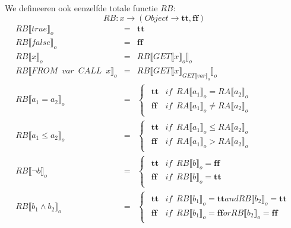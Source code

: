 \documentclass[12pt]{article}
\begin{document}
We defineeren ook eenzelfde totale functie $ RB $:
\[ RB: x \rightarrow (Object \rightarrow {\boldsymbol{tt},\boldsymbol{ff}} ) \]
\[
\begin{matrix}
RB\llbracket true \rrbracket_o & = & \boldsymbol{tt}\\
RB\llbracket false \rrbracket_o & = & \boldsymbol{ff}\\

RB\llbracket x \rrbracket_o & = & RB\llbracket GET\llbracket x \rrbracket_o \rrbracket_o\\

RB\llbracket FROM \enspace var \enspace CALL \enspace x \rrbracket_o & = & RB\llbracket GET\llbracket x \rrbracket_{GET\llbracket var \rrbracket_o} \rrbracket_o\\

RB\llbracket a_1 = a_2 \rrbracket_o & = &
\begin{cases}
\begin{matrix}
\boldsymbol{tt} & if \enspace RA\llbracket a_1 \rrbracket_o = RA\llbracket a_2 \rrbracket_o \\
\boldsymbol{ff} & if \enspace RA\llbracket a_1 \rrbracket_o \not= RA\llbracket a_2 \rrbracket_o
\end{matrix}
\end{cases}\\

RB\llbracket a_1 \leq a_2 \rrbracket_o & = &
\begin{cases}
\begin{matrix}
\boldsymbol{tt} & if \enspace RA\llbracket a_1 \rrbracket_o \leq RA\llbracket a_2 \rrbracket_o \\
\boldsymbol{ff} & if \enspace RA\llbracket a_1 \rrbracket_o > RA\llbracket a_2 \rrbracket_o
\end{matrix}
\end{cases}\\

RB\llbracket \neg b \rrbracket_o & = &
\begin{cases}
\begin{matrix}
\boldsymbol{tt} & if \enspace RB\llbracket b \rrbracket_o = \boldsymbol{ff} \\
\boldsymbol{ff} & if \enspace RB\llbracket b \rrbracket_o = \boldsymbol{tt}
\end{matrix}
\end{cases}\\

RB\llbracket b_1 \wedge b_2 \rrbracket_o & = &
\begin{cases}
\begin{matrix}
\boldsymbol{tt} & if \enspace RB\llbracket b_1 \rrbracket_o = \boldsymbol{tt} and RB\llbracket b_2 \rrbracket_o = \boldsymbol{tt}\\
\boldsymbol{ff} & if \enspace RB\llbracket b_1 \rrbracket_o = \boldsymbol{ff} or RB\llbracket b_2 \rrbracket_o = \boldsymbol{ff}
\end{matrix}
\end{cases}\\

\end{matrix}
\]
\end{document}
